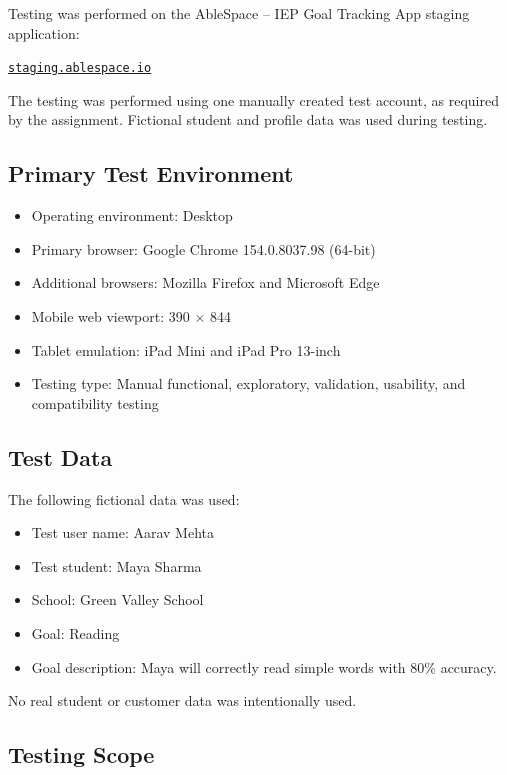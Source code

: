 \documentclass[11pt,a4paper]{article}
\begin{document}
Testing was performed on the AbleSpace -- IEP Goal Tracking App staging application:

\begin{center}
\href{https://staging.ablespace.io}{\texttt{staging.ablespace.io}}
\end{center}

The testing was performed using one manually created test account, as required by the assignment. Fictional student and profile data was used during testing.

\subsection{Primary Test Environment}

\begin{itemize}
    \item Operating environment: Desktop
    \item Primary browser: Google Chrome 154.0.8037.98 (64-bit)
    \item Additional browsers: Mozilla Firefox and Microsoft Edge
    \item Mobile web viewport: 390 $\times$ 844
    \item Tablet emulation: iPad Mini and iPad Pro 13-inch
    \item Testing type: Manual functional, exploratory, validation, usability, and compatibility testing
\end{itemize}

\subsection{Test Data}

The following fictional data was used:

\begin{itemize}
    \item Test user name: Aarav Mehta
    \item Test student: Maya Sharma
    \item School: Green Valley School
    \item Goal: Reading
    \item Goal description: Maya will correctly read simple words with 80\% accuracy.
\end{itemize}

No real student or customer data was intentionally used.

\subsection{Testing Scope}
\end{document}
